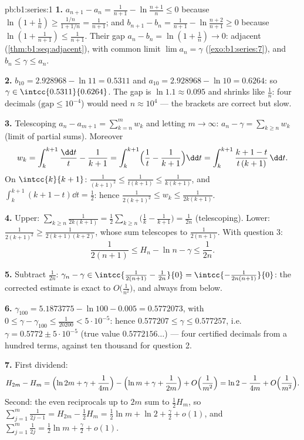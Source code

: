 \begin{solution}{pb:b1:series:1}
\textbf{1.} $a_{n+1} - a_n = \frac{1}{n+1} - \ln\frac{n+1}{n}
\leq 0$ because $\ln(1 + \frac1n) \geq \frac{1/n}{1 + 1/n} =
\frac{1}{n+1}$; and $b_{n+1} - b_n = \frac{1}{n+1} -
\ln\frac{n+2}{n+1} \geq 0$ because $\ln(1 + \frac{1}{n+1}) \leq
\frac{1}{n+1}$. Their gap $a_n - b_n = \ln(1 + \frac1n) \to 0$:
adjacent (\cref{thm:b1:seq:adjacent}), with common limit $\lim
a_n = \gamma$ (\cref{exo:b1:series:7}), and $b_n \leq \gamma
\leq a_n$.

\textbf{2.} $b_{10} = 2.928968 - \ln 11 = 0.5311$ and $a_{10} =
2.928968 - \ln 10 = 0.6264$: so $\gamma \in
\intcc{0.5311}{0.6264}$. The gap is $\ln 1.1 \approx 0.095$ and
shrinks like $\frac1n$: four decimals ($\text{gap} \leq
10^{-4}$) would need $n \approx 10^4$ --- the brackets are
correct but slow.

\textbf{3.} Telescoping $a_n - a_{m+1} = \sum_{k=n}^{m} w_k$ and
letting $m \to \infty$: $a_n - \gamma = \sum_{k\geq n} w_k$
(limit of partial sums). Moreover
\[
w_k = \int_k^{k+1} \frac{\dd t}{t} - \frac{1}{k+1}
= \int_k^{k+1} \Bigl(\frac1t - \frac{1}{k+1}\Bigr)\dd t
= \int_k^{k+1} \frac{k + 1 - t}{t\,(k+1)}\,\dd t .
\]
On $\intcc{k}{k+1}$: $\frac{1}{(k+1)^2} \leq \frac{1}{t(k+1)}
\leq \frac{1}{k(k+1)}$, and $\int_k^{k+1}(k + 1 - t)\dd t =
\frac12$: hence $\frac{1}{2(k+1)^2} \leq w_k \leq
\frac{1}{2k(k+1)}$.

\textbf{4.} Upper: $\sum_{k \geq n} \frac{1}{2k(k+1)} =
\frac12\sum_{k\geq n}\bigl(\frac1k - \frac{1}{k+1}\bigr) =
\frac{1}{2n}$ (telescoping). Lower: $\frac{1}{2(k+1)^2} \geq
\frac{1}{2(k+1)(k+2)}$, whose sum telescopes to
$\frac{1}{2(n+1)}$. With question 3:
\[
\frac{1}{2(n+1)} \leq H_n - \ln n - \gamma \leq \frac{1}{2n} .
\]

\textbf{5.} Subtract $\frac{1}{2n}$: $\gamma_n - \gamma \in
\intcc{\frac{1}{2(n+1)} - \frac{1}{2n}}{0} =
\intcc{-\frac{1}{2n(n+1)}}{0}$: the corrected estimate is exact
to $O\bigl(\frac{1}{n^2}\bigr)$, and always from below.

\textbf{6.} $\gamma_{100} = 5.1873775 - \ln 100 - 0.005 =
0.5772073$, with $0 \leq \gamma - \gamma_{100} \leq
\frac{1}{20200} < 5\cdot10^{-5}$: hence $0.577207 \leq \gamma
\leq 0.577257$, i.e.\ $\gamma = 0.5772 \pm 5\cdot10^{-5}$ (true
value $0.5772156\dots$) --- four certified decimals from a
hundred terms, against ten thousand for question 2.

\textbf{7.} First dividend:
\[
H_{2m} - H_m = \Bigl(\ln 2m + \gamma + \frac{1}{4m}\Bigr)
- \Bigl(\ln m + \gamma + \frac{1}{2m}\Bigr) +
O\Bigl(\frac{1}{m^2}\Bigr)
= \ln 2 - \frac{1}{4m} + O\Bigl(\frac{1}{m^2}\Bigr).
\]
Second: the even reciprocals up to $2m$ sum to $\frac12 H_m$, so
$\sum_{j=1}^{m}\frac{1}{2j-1} = H_{2m} - \frac12 H_m = \frac12
\ln m + \ln 2 + \frac\gamma2 + o(1)$, and $\sum_{j=1}^m
\frac{1}{2j} = \frac12\ln m + \frac\gamma2 + o(1)$.


\end{solution}
